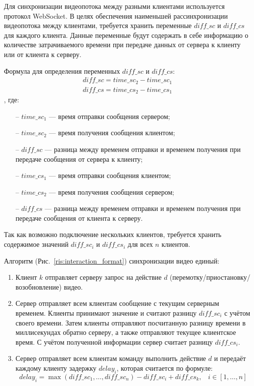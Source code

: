 Для синхронизации видеопотока между разными клиентами используется протокол WebSocket.
В целях обеспечения наименьшей рассинхронизации видеопотока между клиентами, требуется хранить переменные \(diff\_sc\) и \(diff\_cs\) для
каждого клиента.
Данные переменные будут содержать в себе информацию о количестве затрачиваемого времени при передаче данных от сервера к клиенту или от клиента к серверу.

Формула для определения переменных \(diff\_sc\) и \(diff\_cs\): \begin{gather*}
                                                                    diff\_sc = time\_sc_2 - time\_sc_1\\
                                                                    diff\_cs = time\_cs_2 - time\_cs_1
\end{gather*}, где:
\begin{itemize}[noitemsep]
    \item[--] \(time\_sc_1\) — время отправки сообщения сервером;
    \item[--] \(time\_sc_2\) — время получения сообщения клиентом;
    \item[--] \(diff\_sc\) — разница между временем отправки и временем получения при передаче сообщения от сервера к клиенту;
    \item[--] \(time\_cs_1\) — время отправки сообщения клиентом;
    \item[--] \(time\_cs_2\) — время получения сообщения сервером;
    \item[--] \(diff\_cs\) — разница между временем отправки и временем получения при передаче сообщения от клиента к серверу.
\end{itemize}

Так как возможно подключение нескольких клиентов, требуется хранить содержимое значений \(diff\_sc_i\) и \(diff\_cs_i\) для всех \(n\) клиентов.

Алгоритм (Рис.~\ref{ris:interaction_format}) синхронизации видео единый:
\begin{enumerate}
    \item Клиент \(k\) отправляет серверу запрос на действие \(d\) (перемотку/приостановку/возобновление) видео.
    \item Сервер отправляет всем клиентам сообщение с текущим серверным временем.
    Клиенты принимают значение и считают разницу \(diff\_sc_i\) с учётом своего времени.
    Затем клиенты отправляют посчитанную разницу времени в миллисекундах обратно серверу, а также отправляют текущее клиентское время.
    С учётом полученной информации сервер считает разницу \(diff\_cs_i\).
    \item Сервер отправляет всем клиентам команду выполнить действие \(d\) и передаёт каждому клиенту задержку \(delay_i\),
    которая считается по формуле: \[ delay_i = \max(diff\_sc_1, \ldots, diff\_sc_n) - diff\_sc_i + diff\_cs_k, \;\;\; i \in [1, \ldots, n] \]
\end{enumerate}

